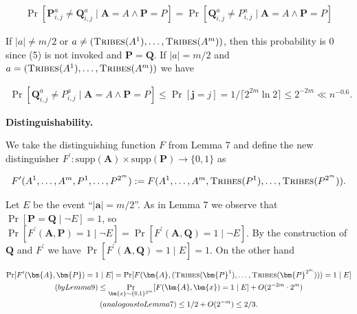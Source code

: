 \[\begin{gathered}
\displaystyle\Pr[\bm{P}^{a}_{i,j}\neq\bm{Q}^{a}_{i,j}\mid\bm{A}=A\land\bm{P}=P] \displaystyle=\Pr[\bm{Q}^{a}_{i,j}\neq P^{a}_{i,j}\mid\bm{A}=A\land\bm{P}=P]
\end{gathered}\]


If $|a|\neq m/2$ or $a\neq(\textsc{Tribes}(A^{1}),\dots,\textsc{Tribes}(A^{m}))$, then this probability is $0$ since (5) is not invoked and $\bm{P}=\bm{Q}$. If $|a|=m/2$ and $a=(\textsc{Tribes}(A^{1}),\dots,\textsc{Tribes}(A^{m}))$ we have\par


\[\begin{gathered}
\Pr[\bm{Q}^{a}_{i,j}\neq P^{a}_{i,j}\mid\bm{A}=A\land\bm{P}=P]\leq\Pr[\bm{j}=j]=1/\lceil 2^{2m}\ln 2\rceil\leq 2^{-2m}\ll n^{-0.6}.
\end{gathered}\]





\par\medskip\noindent\textbf{Distinguishability.}\par




We take the distinguishing function $F$ from Lemma 7 and define the new distinguisher $F^{\prime}\colon\mathrm{supp}(\bm{A})\times\mathrm{supp}(\bm{P})\to\{0,1\}$ as\par


\[\begin{gathered}
F^{\prime}(A^{1},\dots,A^{m},P^{1},\dots,P^{2^{m}}):=F(A^{1},\dots,A^{m},\textsc{Tribes}(P^{1}),\dots,\textsc{Tribes}(P^{2^{m}})).
\end{gathered}\]


Let $E$ be the event “$|\bm{a}|=m/2$”. As in Lemma 7 we observe that $\Pr[\bm{P}=\bm{Q}\mid\lnot E]=1$, so $\Pr[F^{\prime}(\bm{A},\bm{P})=1\mid\lnot E]=\Pr[F^{\prime}(\bm{A},\bm{Q})=1\mid\lnot E]$. By the construction of $\bm{Q}$ and $F^{\prime}$ we have $\Pr[F^{\prime}(\bm{A},\bm{Q})=1\mid E]=1$. On the other hand\par


\[\begin{gathered}
\displaystyle\Pr[F^{\prime}(\bm{A},\bm{P})=1\mid E] \displaystyle=\Pr[F(\bm{A},(\textsc{Tribes}(\bm{P}^{1}),\dots,\textsc{Tribes}(\bm{P}^{2^{m}})))=1\mid E] \\
(by Lemma 9) \displaystyle\leq\Pr_{\bm{x}\sim\{0,1\}^{2^{m}}}[F(\bm{A},\bm{x})=1\mid E]+O(2^{-2m}\cdot 2^{m}) \\
(analogous to Lemma 7) \displaystyle\leq 1/2+O(2^{-m})\leq 2/3.
\end{gathered}\]


